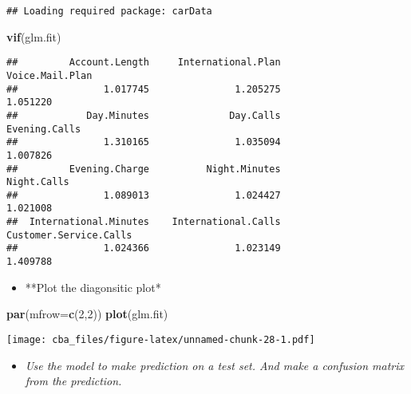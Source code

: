 \documentclass[]{article}
\newenvironment{Shaded}{\begin{snugshade}}{\end{snugshade}}
\newcommand{\DataTypeTok}[1]{\textcolor[rgb]{0.13,0.29,0.53}{#1}}
\newcommand{\DecValTok}[1]{\textcolor[rgb]{0.00,0.00,0.81}{#1}}
\newcommand{\KeywordTok}[1]{\textcolor[rgb]{0.13,0.29,0.53}{\textbf{#1}}}
\newcommand{\NormalTok}[1]{#1}
\newcommand{\OperatorTok}[1]{\textcolor[rgb]{0.81,0.36,0.00}{\textbf{#1}}}
\newcommand{\StringTok}[1]{\textcolor[rgb]{0.31,0.60,0.02}{#1}}
\providecommand{\tightlist}{%
  \setlength{\itemsep}{0pt}\setlength{\parskip}{0pt}}
\begin{document}
\begin{verbatim}
## Loading required package: carData
\end{verbatim}

\begin{Shaded}
\begin{Highlighting}[]
\KeywordTok{vif}\NormalTok{(glm.fit)}
\end{Highlighting}
\end{Shaded}

\begin{verbatim}
##         Account.Length     International.Plan        Voice.Mail.Plan 
##               1.017745               1.205275               1.051220 
##            Day.Minutes              Day.Calls          Evening.Calls 
##               1.310165               1.035094               1.007826 
##         Evening.Charge          Night.Minutes            Night.Calls 
##               1.089013               1.024427               1.021008 
##  International.Minutes    International.Calls Customer.Service.Calls 
##               1.024366               1.023149               1.409788
\end{verbatim}

\begin{itemize}
\tightlist
\item
  **Plot the diagonsitic plot*
\end{itemize}

\begin{Shaded}
\begin{Highlighting}[]
\KeywordTok{par}\NormalTok{(}\DataTypeTok{mfrow=}\KeywordTok{c}\NormalTok{(}\DecValTok{2}\NormalTok{,}\DecValTok{2}\NormalTok{))}
\KeywordTok{plot}\NormalTok{(glm.fit)}
\end{Highlighting}
\end{Shaded}

\texttt{[image: cba\_files/figure-latex/unnamed-chunk-28-1.pdf]}

\begin{itemize}
\tightlist
\item
  \emph{Use the model to make prediction on a test set. And make a
  confusion matrix from the prediction.}
\end{itemize}

\begin{Shaded}
\end{Shaded}
\end{document}
